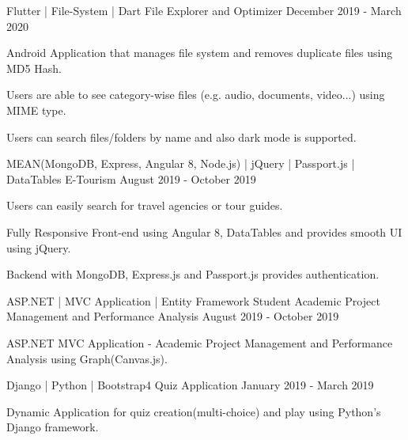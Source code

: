 
\begin{cventries}
  \cventry
    {Flutter | File-System | Dart } %
    {File Explorer and Optimizer} %
    {} %
    {December 2019 - March 2020} %
    {
      \begin{cvitems} %
        \item {Android Application that manages file system and removes duplicate files using MD5 Hash.}
		\item {Users are able to see category-wise files (e.g. audio, documents, video...) using MIME type.}
		\item{Users can search files/folders by name and also dark mode is supported.}
      \end{cvitems}
    }
    \cventry
    {MEAN(MongoDB, Express, Angular 8, Node.js) | jQuery | Passport.js | DataTables} %
    {E-Tourism} %
    {} %
    {August 2019 - October 2019} %
    {
      \begin{cvitems} %
        \item{Users can easily search for travel agencies or tour guides.}
      	\item {Fully Responsive Front-end using Angular 8, DataTables and provides smooth UI using jQuery.}
		\item {Backend with MongoDB, Express.js and  Passport.js provides authentication.}
      \end{cvitems}
    }
    \vspace{1.9 mm}
    \cventry
    {ASP.NET | MVC Application | Entity Framework} %
    {Student Academic Project Management and Performance Analysis} %
    {} %
    {August 2019 - October 2019} %
    {
      \begin{cvitems} %
      	\item {ASP.NET MVC Application - Academic Project Management and Performance Analysis using Graph(Canvas.js).}
      \end{cvitems}
    }
    \cventry
    {Django | Python | Bootstrap4} %
    {Quiz Application} %
    {} %
    {January 2019 - March 2019} %
    {
      \begin{cvitems} %
      	\item {Dynamic Application for quiz creation(multi-choice) and play using Python's Django framework.}

\end{cvitems}}
\end{cventries}
